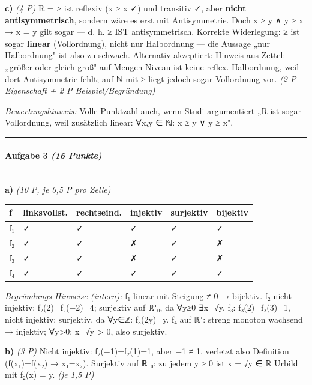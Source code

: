 \documentclass[11pt, a4paper]{article}
\begin{document}
\textbf{c)} \textit{(4 P)} R = ≥ ist reflexiv (x ≥ x ✓) und transitiv ✓, aber \textbf{nicht antisymmetrisch}, sondern wäre es erst mit Antisymmetrie. Doch x ≥ y ∧ y ≥ x → x = y gilt sogar — d. h. ≥ IST antisymmetrisch. Korrekte Widerlegung: ≥ ist sogar \textbf{linear} (Vollordnung), nicht nur Halbordnung — die Aussage „nur Halbordnung" ist also zu schwach. Alternativ-akzeptiert: Hinweis aus Zettel: „größer oder gleich groß" auf Mengen-Niveau ist keine reflex. Halbordnung, weil dort Antisymmetrie fehlt; auf ℕ mit ≥ liegt jedoch sogar Vollordnung vor. \textit{(2 P Eigenschaft + 2 P Beispiel/Begründung)}


\textit{Bewertungshinweis:} Volle Punktzahl auch, wenn Studi argumentiert „R ist sogar Vollordnung, weil zusätzlich linear: ∀x,y ∈ ℕ: x ≥ y ∨ y ≥ x".



\noindent\textcolor{rulegray}{\rule{\linewidth}{0.4pt}}


\paragraph{Aufgabe 3 \textit{(16 Punkte)}}\mbox{}\\[2pt]

\textbf{a)} \textit{(10 P, je 0,5 P pro Zelle)}



{\small
\begin{tabularx}{\linewidth}{XXXXXX}
\hline
\rowcolor{tableheadbg}
{\color{white}\textbf{f}} & {\color{white}\textbf{linksvollst.}} & {\color{white}\textbf{rechtseind.}} & {\color{white}\textbf{injektiv}} & {\color{white}\textbf{surjektiv}} & {\color{white}\textbf{bijektiv}} \\[2pt]
\hline
\endhead
\hline
\endfoot
f₁ & ✓ & ✓ & ✓ & ✓ & ✓ \\
f₂ & ✓ & ✓ & ✗ & ✓ & ✗ \\
f₃ & ✓ & ✓ & ✗ & ✓ & ✗ \\
f₄ & ✓ & ✓ & ✓ & ✓ & ✓ \\
\end{tabularx}
}


\textit{Begründungs-Hinweise (intern):} f₁ linear mit Steigung ≠ 0 → bijektiv. f₂ nicht injektiv: f₂(2)=f₂(−2)=4; surjektiv auf ℝ⁺₀, da ∀y≥0 ∃x=√y. f₃: f₃(2)=f₃(3)=1, nicht injektiv; surjektiv, da ∀y∈ℤ: f₃(2y)=y. f₄ auf ℝ⁺: streng monoton wachsend → injektiv; ∀y>0: x=√y > 0, also surjektiv.


\textbf{b)} \textit{(3 P)} Nicht injektiv: f₂(−1)=f₂(1)=1, aber −1 ≠ 1, verletzt also Definition (f(x₁)=f(x₂) → x₁=x₂). Surjektiv auf ℝ⁺₀: zu jedem y ≥ 0 ist x = √y ∈ ℝ Urbild mit f₂(x) = y. \textit{(je 1,5 P)}
\end{document}
